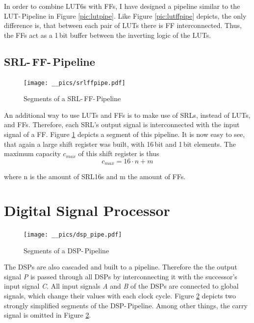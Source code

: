 In order to combine \acp{LUT6} with \acp{FF}, I have designed a pipeline similar to the \ac{LUT}-\,Pipeline in Figure \ref{pic:lutpipe}. Like Figure \ref{pic:lutffpipe} depicts, the only difference is, that between each pair of \acp{LUT} there is \ac{FF} interconnected. Thus, the \acp{FF} act as a 1\,bit buffer between the inverting logic of the \acp{LUT}.


\subsection{SRL-\,FF-\,Pipeline}

\begin{figure}[h]
		\texttt{[image: \_\_pics/srlffpipe.pdf]}
		\caption{Segments of a SRL-\,FF-\,Pipeline}
		\label{pic:srlffpipe}	
	\end{figure} 
	
An additional way to use \acp{LUT} and \acp{FF} is to make use of \acp{SRL}, instead of \acp{LUT}, and \acp{FF}. Therefore, each \ac{SRL}'s output signal is interconnected with the input signal of a \ac{FF}. Figure \ref{pic:srlffpipe} depicts a segment of this pipeline. It is now easy to see, that again a large shift register was built, with 16\,bit and 1\,bit elements. The maximum capacity $c_{max}$ of this shift register is thus
\begin{equation}
c_{max} = 16 \cdot n + m
\label{eq:eee}
\end{equation}

where n is the amount of \acp{SRL16} and m the amount of \acp{FF}.

\section{Digital Signal Processor}
\label{sec:dsp}

\begin{figure}[h]
		\texttt{[image: \_\_pics/dsp\_pipe.pdf]}
		\caption{Segments of a DSP-\,Pipeline}
		\label{pic:dsppipe}	
	\end{figure} 

The \acp{DSP} are also cascaded and built to a pipeline. Therefore the the output signal \textit{P} is passed through all \acp{DSP} by interconnecting it with the successor's input signal \textit{C}. All input signals \textit{A} and \textit{B} of the \acp{DSP} are connected to global signals, which change their values with each clock cycle. Figure \ref{pic:dsppipe} depicts two strongly simplified segments of the \ac{DSP}-\,Pipeline. Among other things, the carry signal is omitted in Figure \ref{pic:dsppipe}.

